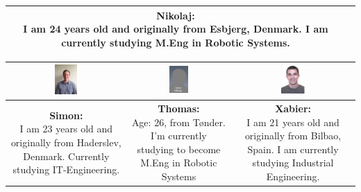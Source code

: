\begin{table}[h]
\begin{tabular}{|c|c|c|c|}
&

\parbox[t] {0.2\textwidth}{
\textbf{Nikolaj:} \\
I am 24 years old and originally from Esbjerg, Denmark. I am currently studying M.Eng in Robotic Systems.
} 

\\\hline
\end{tabular}

\begin{tabular}{|c|c|c|}
\hline
\includegraphics[width=0.2\textwidth]{graphics/Simon_profile} & %
\includegraphics[width=0.2\textwidth]{graphics/AnonProfile} & %
\includegraphics[width=0.2\textwidth]{graphics/sexy_xabi_profile} \\ \hline %
\parbox[t] {0.2\textwidth}{
\textbf{Simon:} \\
I am 23 years old and originally from Haderslev, Denmark. Currently studying IT-Engineering.

} 

&

\parbox[t] {0.2\textwidth}{
\textbf{Thomas:} \\
Age: 26, from Tønder. I'm currently studying to become M.Eng in Robotic Systems
} 

&

\parbox[t] {0.2\textwidth}{
\textbf{Xabier:} \\
I am 21 years old and originally from Bilbao, Spain. I am currently studying Industrial Engineering.
} 

\\\hline
\end{tabular}
\end{table}



